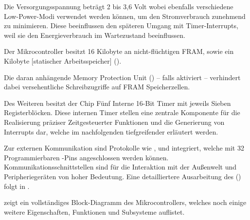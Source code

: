 \newpage
Die Versorgungsspannung betr\"agt 2 bis 3,6 Volt wobei ebenfalls verschiedene Low-Power-Modi verwendet werden k\"onnen, um den Stromverbrauch zunehmend zu minimieren. Diese beeinflussen den sp\"ateren Umgang mit Timer-Interrupts, weil sie den Energieverbrauch im Wartezustand beeinflussen. 

Der Mikrocontroller besitzt 16 Kilobyte an nicht-fl\"uchtigen FRAM, sowie ein Kilobyte [statischer Arbeitsspeicher] (). 

Die daran anh\"angende Memory Protection Unit () -- falls aktiviert -- verhindert dabei versehentliche Schreibzugriffe auf FRAM Speicherzellen. \\

Des Weiteren besitzt der Chip F\"unf Interne 16-Bit Timer mit jeweils Sieben\\ Registerbl\"ocken. Diese internen Timer stellen eine zentrale Komponente f\"ur die Realisierung pr\"aziser Zeitgesteuerter Funktionen und die Generierung von Interrupts dar, welche im nachfolgenden  tiefgreifender erl\"autert werden.

Zur externen Kommunikation sind Protokolle wie ,  und  integriert, welche mit 32 Programmierbaren -Pins angeschlossen werden k\"onnen. Kommunikationsschnittstellen sind f\"ur die Interaktion mit der Au{\ss}enwelt und Peripherieger\"aten von hoher Bedeutung. Eine detailliertere Ausarbeitung des  () folgt in .\\	

\newpage
{} zeigt ein vollst\"andiges Block-Diagramm des Mikrocontrollers, welches noch einige weitere Eigenschaften, Funktionen und Subsysteme auflistet.\AI

